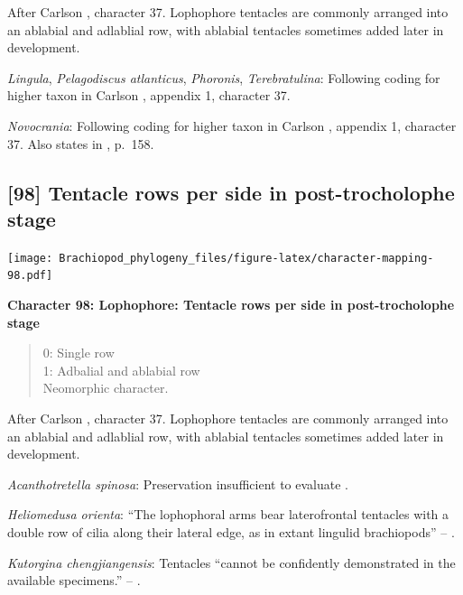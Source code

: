 \documentclass[openany]{book}
\theoremstyle{definition}
\theoremstyle{definition}
\theoremstyle{definition}
\theoremstyle{remark}
\begin{document}
After Carlson \citeyearpar{Carlson1995Phylogeneticrelationships},
character 37. Lophophore tentacles are commonly arranged into an
ablabial and adlablial row, with ablabial tentacles sometimes added
later in development.

\hypertarget{Lingula-coding-97}{}
\emph{Lingula}, \emph{Pelagodiscus atlanticus}, \emph{Phoronis},
\emph{Terebratulina}: Following coding for higher taxon in Carlson
\citeyearpar{Carlson1995Phylogeneticrelationships}, appendix 1,
character 37.

\hypertarget{Novocrania-coding-97}{}
\emph{Novocrania}: Following coding for higher taxon in Carlson
\citeyearpar{Carlson1995Phylogeneticrelationships}, appendix 1,
character 37. Also states in
\citet{Williams2000LinguliformeaCraniiformea}, p.~158.

\subsection*{{[}98{]} Tentacle rows per side in post-trocholophe
stage}\label{tentacle-rows-per-side-in-post-trocholophe-stage}

\texttt{[image: Brachiopod\_phylogeny\_files/figure-latex/character-mapping-98.pdf]}

\textbf{Character 98: Lophophore: Tentacle rows per side in
post-trocholophe stage}

\begin{quote}
0: Single row\\
1: Adbalial and ablabial row\\
Neomorphic character.
\end{quote}

After Carlson \citeyearpar{Carlson1995Phylogeneticrelationships},
character 37. Lophophore tentacles are commonly arranged into an
ablabial and adlablial row, with ablabial tentacles sometimes added
later in development.

\hypertarget{Acanthotretella_spinosa-coding-98}{}
\emph{Acanthotretella spinosa}: Preservation insufficient to evaluate
\citep{Holmer2006Aspinose}.

\hypertarget{Heliomedusa_orienta-coding-98}{}
\emph{Heliomedusa orienta}: ``The lophophoral arms bear laterofrontal
tentacles with a double row of cilia along their lateral edge, as in
extant lingulid brachiopods'' -- \citet{Zhang2009Architectureand}.

\hypertarget{Kutorgina_chengjiangensis-coding-98}{}
\emph{Kutorgina chengjiangensis}: Tentacles ``cannot be confidently
demonstrated in the available specimens.'' --
\citet{Zhang2007Rhynchonelliformeanbrachiopods}.
\end{document}

